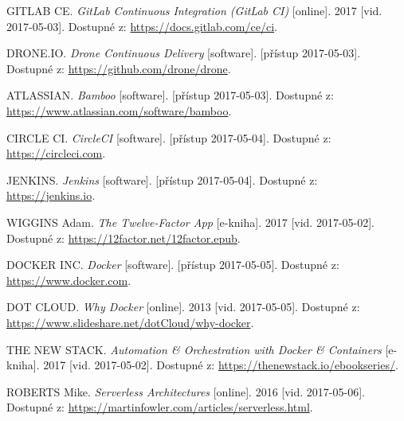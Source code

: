 \documentclass[FM,DP]{tulthesis}
\begin{document}
\begin{thebibliography}{Mm99}
GITLAB CE. 
\emph{GitLab Continuous Integration (GitLab CI)} [online]. 
2017 [vid. 2017-05-03]. Dostupné z: 
\url{https://docs.gitlab.com/ce/ci}.

DRONE.IO. 
\emph{Drone Continuous Delivery} [software]. 
[přístup 2017-05-03]. Dostupné z: 
\url{https://github.com/drone/drone}.

ATLASSIAN. 
\emph{Bamboo} [software]. 
[přístup 2017-05-03]. Dostupné z: 
\url{https://www.atlassian.com/software/bamboo}.

CIRCLE CI. 
\emph{CircleCI} [software]. 
[přístup 2017-05-04]. Dostupné z: 
\url{https://circleci.com}.

JENKINS. 
\emph{Jenkins} [software]. 
[přístup 2017-05-04]. Dostupné z: 
\url{https://jenkins.io}.


WIGGINS Adam. 
\emph{The Twelve-Factor App} [e-kniha].
2017 [vid. 2017-05-02]. Dostupné z: \url{https://12factor.net/12factor.epub}.

DOCKER INC. 
\emph{Docker} [software]. 
[přístup 2017-05-05]. Dostupné z: 
\url{https://www.docker.com}.

DOT CLOUD. 
\emph{Why Docker} [online].
2013 [vid. 2017-05-05]. Dostupné z: \url{https://www.slideshare.net/dotCloud/why-docker}.

THE NEW STACK. 
\emph{Automation \& Orchestration with Docker \& Containers} [e-kniha]. 
2017 [vid. 2017-05-02]. Dostupné z: \url{https://thenewstack.io/ebookseries/}.

ROBERTS Mike. 
\emph{Serverless Architectures} [online]. 
2016 [vid. 2017-05-06]. Dostupné z: 
\url{https://martinfowler.com/articles/serverless.html}.

\end{thebibliography}


\end{document}
